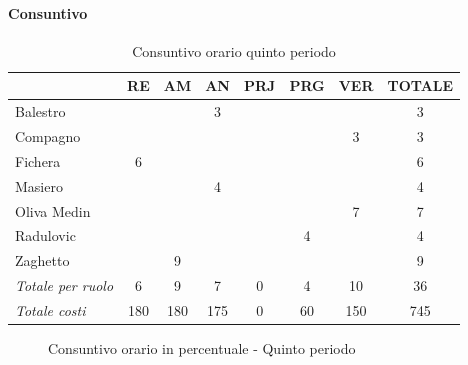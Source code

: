 \documentclass[a4paper,12pt]{article}
\begin{document}
            \paragraph{Consuntivo}
                \begin{table}[H]
                \centering
                \caption{Consuntivo orario quinto periodo}
                \begin{tabular}{|l|c|c|c|c|c|c|c|}
                \hline
                    \rowcolor{lightgray}{\textbf{Membro}} & {\textbf{RE}} & {\textbf{AM}} & {\textbf{AN}} & {\textbf{PRJ}} & {\textbf{PRG}} & {\textbf{VER}} & {\textbf{TOTALE}}\\
                \hline
                    Balestro & & & 3 & & & & 3\\
                \hline
                    Compagno & & & & & & 3 & 3\\
                \hline
                    Fichera & 6 & & & & & & 6\\
                \hline
                    Masiero & & & 4 & & & & 4\\
                \hline
                    Oliva Medin & & & & & & 7 & 7\\
                \hline
                    Radulovic & & & & & 4 & & 4\\
                \hline
                    Zaghetto & & 9 & & & & & 9\\
                \hline
                    \rowcolor{lightgray}\textit{Totale per ruolo} & 6 & 9 & 7 & 0 & 4 & 10 & 36\\
                \hline
                    \rowcolor{lightgray}\textit{Totale costi} & 180 & 180 & 175 & 0 & 60 & 150 & 745\\
                \hline
                \end{tabular}
                \end{table}

                \begin{figure}[H]
                \centering
                \caption{Consuntivo orario in percentuale - Quinto periodo}
                \end{figure}
                
\end{document}
